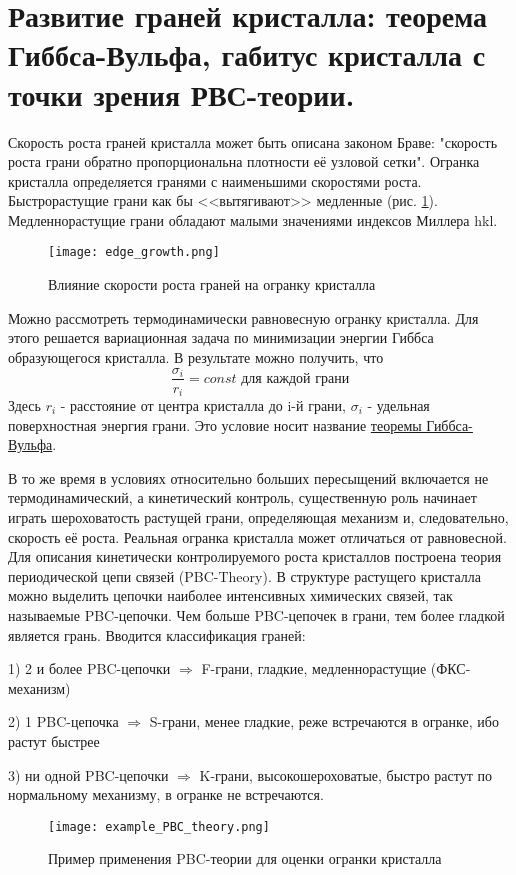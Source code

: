\section{Развитие граней кристалла: теорема Гиббса-Вульфа, габитус кристалла с
точки зрения РВС-теории.}
Скорость роста граней кристалла может быть описана законом Браве: "скорость роста грани обратно пропорциональна плотности её узловой сетки". Огранка кристалла определяется гранями с наименьшими скоростями роста. Быстрорастущие грани как бы <<вытягивают>> медленные (рис. \ref{fig:edge_growth}). Медленнорастущие грани обладают малыми значениями индексов Миллера hkl.
\begin{figure}[h!]
\centering
\texttt{[image: edge\_growth.png]}\caption{Влияние скорости роста граней на огранку кристалла}\label{fig:edge_growth}
\end{figure}
Можно рассмотреть термодинамически равновесную огранку кристалла. Для этого решается вариационная задача по минимизации энергии Гиббса образующегося кристалла. В результате можно получить, что
\begin{equation}
\frac{\sigma_i}{r_i} = const \text{ для каждой грани}
\label{eq:Gibbs-Woolf_theorem}  
\end{equation}
Здесь $r_i$ - расстояние от центра кристалла до i-й грани, $\sigma_i$ - удельная поверхностная энергия грани. Это условие носит название \underline{теоремы Гиббса-Вульфа}.\par
В то же время в условиях относительно больших пересыщений включается не термодинамический, а кинетический контроль, существенную роль начинает играть шероховатость растущей грани, определяющая механизм и, следовательно, скорость её роста. Реальная огранка кристалла может отличаться от равновесной. Для описания кинетически контролируемого роста кристаллов построена теория периодической цепи связей (PBC-Theory). В структуре растущего кристалла можно выделить цепочки наиболее интенсивных химических связей, так называемые PBC-цепочки. Чем больше PBC-цепочек в грани, тем более гладкой является грань. Вводится классификация граней:
\par
1) 2 и более PBC-цепочки $\Rightarrow$ F-грани, гладкие, медленнорастущие (ФКС-механизм)
\par
2) 1 PBC-цепочка $\Rightarrow$ S-грани, менее гладкие, реже встречаются в огранке, ибо растут быстрее
\par
3) ни одной PBC-цепочки $\Rightarrow$ K-грани, высокошероховатые, быстро растут по нормальному механизму, в огранке не встречаются.
\begin{figure}[h!]
\centering
\texttt{[image: example\_PBC\_theory.png]}\caption{Пример применения PBC-теории для оценки огранки кристалла} \label{fig:example_PBC_theory}
\end{figure}
